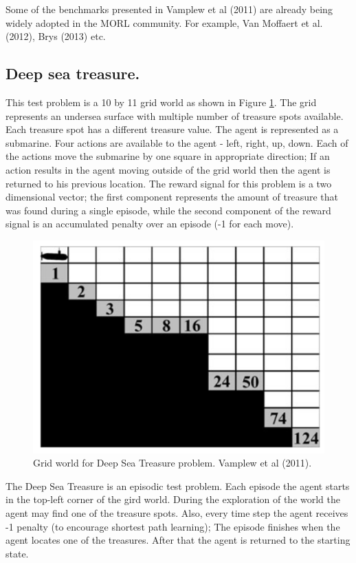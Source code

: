 Some of the benchmarks presented in Vamplew et al (2011)\nocite{vamplew2011empirical} are already being widely adopted in the MORL community. For example, Van Moffaert et al. (2012)\nocite{vamplew2011empirical}, Brys (2013)\nocite{brysmulti} etc.

\subsection{Deep sea treasure.}
This test problem is a 10 by 11 grid world as shown in Figure \ref{fig:DSTOverview}. The grid represents an undersea surface with multiple number of treasure spots available. Each treasure spot has a different treasure value. The agent is represented as a submarine. Four actions are available to the agent - left, right, up, down. Each of the actions move the submarine by one square in appropriate direction; If an action results in the agent moving outside of the grid world then the agent is returned to his previous location. The reward signal for this problem is a two dimensional vector; the first component represents the amount of treasure that was found during a single episode, while the second component of the reward signal is an accumulated penalty over an episode (-1 for each move).

\begin{figure}[ht]
\vskip 0.2in
\centering
\includegraphics[scale=0.9]{dst.png}
\caption{Grid world for Deep Sea Treasure problem. Vamplew et al (2011).}
\label{fig:DSTOverview}
\end{figure}

The Deep Sea Treasure is an episodic test problem. Each episode the agent starts in the top-left corner of the gird world. During the exploration of the world the agent may find one of the treasure spots. Also, every time step the agent receives -1 penalty (to encourage shortest path learning); The episode finishes when the agent locates one of the treasures. After that the agent is returned to the starting state.

